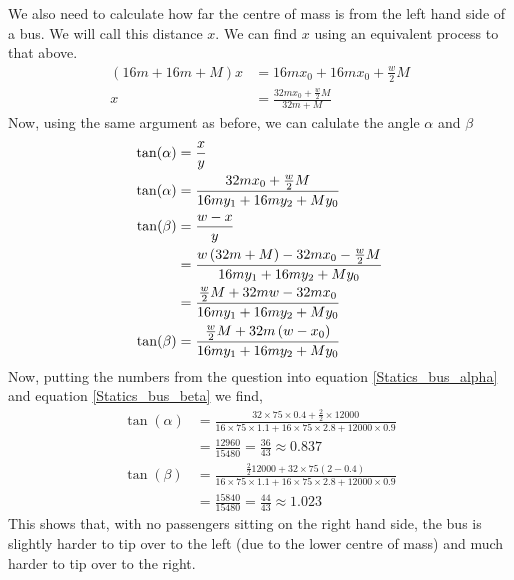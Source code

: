 \begin{hint}[A1974AMIQ5a]
{\begin{enumerate}
	We also need to calculate how far the centre of mass is from the left hand side of a bus. We will call this distance $x$. We can find $x$ using an equivalent process to that above.
		\begin{align*}(16m+16m+M)x&=16mx_0+16mx_0+\frac{w}{2}M	
\\						x&=\frac{32mx_0+\frac{w}{2}M}{32m+M}\end{align*}
	Now, using the same argument as before, we can calulate the angle $\alpha$ and $\beta$ %
		\begin{align}\tan(\alpha)&=\frac{x}{y}													\notag
\\				\tan(\alpha)&=\frac{32mx_0+\frac{w}{2}M}{16my_1+16my_2+My_0}						\label{Statics_bus_alpha}
\\				\tan(\beta)&=\frac{w-x}{y}												\notag
\\						&=\frac{w\left(32m+M\right)-32mx_0-\frac{w}{2}M}{16my_1+16my_2+My_0}		\notag
\\						&=\frac{\frac{w}{2}M+32mw-32mx_0}{16my_1+16my_2+My_0}					\notag
\\				\tan(\beta)&=\frac{\frac{w}{2}M+32m\left(w-x_0\right)}{16my_1+16my_2+My_0}				\label{Statics_bus_beta}\end{align}
	Now, putting the numbers from the question into equation \ref{Statics_bus_alpha} and equation \ref{Statics_bus_beta} we find,
		\begin{align*}\tan(\alpha)&=\frac{32\times 75\times0.4+\frac{2}{2}\times 12000}{16\times 75 \times 1.1+16\times 75 \times 2.8+12000\times 0.9}
\\						&=\frac{12960}{15480}=\frac{36}{43}\approx0.837
\\				\tan(\beta)&=\frac{\frac{2}{2}12000+32\times 75\left(2-0.4\right)}{16\times 75 \times 1.1+16\times 75 \times 2.8+12000\times 0.9}
\\						&=\frac{15840}{15480}=\frac{44}{43}\approx1.023
		\end{align*}
	This shows that, with no passengers sitting on the right hand side, the bus is slightly harder to tip over to the left (due to the lower centre of mass) and much harder to tip over to the right.


\end{enumerate}
}
\end{hint}